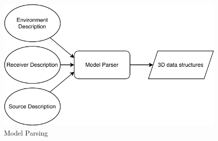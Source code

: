 \begin{figure}[H]
    \begin{center}
    \includegraphics[width=\textwidth]{figures/approach/figModelParser.pdf}
    \end{center}
    \caption[Model Parsing]{Model Parsing}
    \label{fig:modelParser}
\end{figure}
